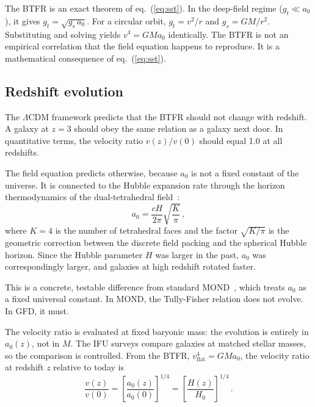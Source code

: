 \documentclass[a4paper,11pt]{article}
\begin{document}
The BTFR is an exact theorem of eq.~(\ref{eq:sst}). In the deep-field regime ($g_t \ll a_0$), it gives $g_t = \sqrt{g_s\,a_0}$. For a circular orbit, $g_t = v^2/r$ and $g_s = GM/r^2$. Substituting and solving yields $v^4 = GMa_0$ identically. The BTFR is not an empirical correlation that the field equation happens to reproduce. It is a mathematical consequence of eq.~(\ref{eq:sst}).

\subsection{Redshift evolution}

The $\Lambda$CDM framework predicts that the BTFR should not change with redshift. A galaxy at $z = 3$ should obey the same relation as a galaxy next door. In quantitative terms, the velocity ratio $v(z)/v(0)$ should equal 1.0 at all redshifts.

The field equation predicts otherwise, because $a_0$ is not a fixed constant of the universe. It is connected to the Hubble expansion rate through the horizon thermodynamics of the dual-tetrahedral field~\cite{nelson2025a}:
\begin{equation}
a_0 = \frac{cH}{2\pi}\sqrt{\frac{K}{\pi}}\,,
\label{eq:a0H}
\end{equation}
where $K = 4$ is the number of tetrahedral faces and the factor $\sqrt{K/\pi}$ is the geometric correction between the discrete field packing and the spherical Hubble horizon. Since the Hubble parameter $H$ was larger in the past, $a_0$ was correspondingly larger, and galaxies at high redshift rotated faster.

This is a concrete, testable difference from standard MOND~\cite{milgrom1983}, which treats $a_0$ as a fixed universal constant. In MOND, the Tully-Fisher relation does not evolve. In GFD, it must.

The velocity ratio is evaluated at fixed baryonic mass: the evolution is entirely in $a_0(z)$, not in $M$. The IFU surveys compare galaxies at matched stellar masses, so the comparison is controlled. From the BTFR, $v_{\mathrm{flat}}^4 = GMa_0$, the velocity ratio at redshift $z$ relative to today is
\begin{equation}
\frac{v(z)}{v(0)} = \left[\frac{a_0(z)}{a_0(0)}\right]^{1/4} = \left[\frac{H(z)}{H_0}\right]^{1/4}\,.
\label{eq:ratio_naive}
\end{equation}
\end{document}

